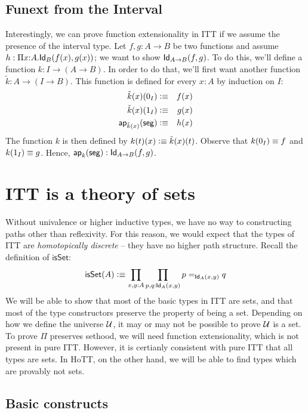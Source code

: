 \documentclass[11pt]{article}
\newcommand*{\Izero}{0_I}
\newcommand*{\Ione}{1_I}
\newcommand*{\Iseg}{\mathsf{seg}}
\newcommand*{\ap}{\mathsf{ap}}
\newcommand*{\isSet}{\mathsf{isSet}}
\begin{document}
\subsection*{{\sc Funext} from the Interval}

Interestingly, we can prove function extensionality in ITT if we assume the
presence of the interval type. Let $f , g : A \to B$ be two functions and
assume $h : \Pi x{:}A. \mathsf{Id}_{B} (f(x), g(x))$; we want to show $\mathsf{Id}_{A\to
B}(f,g)$. To do this, we'll define a function $k : I \to (A \to B)$. In
order to do that, we'll first want another function 
$\tilde{k} : A \to (I \to B)$. 
This function is defined for every $x : A$ by induction on $I$:
\begin{eqnarray*} \tilde{k}(x)(\Izero) &\defeq& f(x) \\ \tilde{k}(x)(\Ione)
&\defeq& g(x) \\ \ap_{\tilde{k}(x)}(\Iseg) &\defeq& h(x) \end{eqnarray*} The
function $k$ is then defined by $k(t)(x) \vcentcolon\equiv \tilde{k}(x)(t)$. Observe that
$k(\Izero) \jdeq f$ and $k(\Ione) \jdeq g$. Hence, $\ap_k(\Iseg) : \Id{A
\to B}(f,g)$.

\section{ITT is a theory of sets}

Without univalence or higher inductive types, we have no way to constructing paths other than reflexivity. For this reason, we would expect that the types of ITT are \emph{homotopically discrete} -- they have no higher path structure. Recall the definition of $\isSet$:
\[
\isSet(A) \defeq \prod_{x,y:A} \prod_{p,q:\Id{A}(x,y)} p =_{\Id{A}(x,y)} q 
\]
We will be able to show that most of the basic types in ITT are sets, and that most of the type constructors preserve the property of being a set. Depending on how we define the universe $\mathcal{U}$, it may or may not be possible to prove $\mathcal{U}$ is a set. To prove $\Pi$ preserves sethood, we will need function extensionality, which is not present in pure ITT. However, it is certianly consistent with pure ITT that all types are sets. In HoTT, on the other hand, we will be able to find types which are provably not sets.

\subsection*{Basic constructs}
\end{document}
